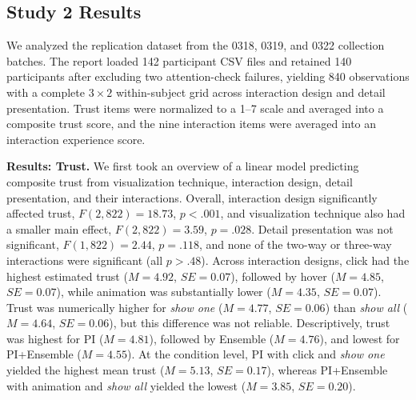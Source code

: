 \subsection{Study 2 Results}
We analyzed the replication dataset from the 0318, 0319, and 0322 collection batches. The report loaded 142 participant CSV files and retained 140 participants after excluding two attention-check failures, yielding 840 observations with a complete $3 \times 2$ within-subject grid across interaction design and detail presentation. Trust items were normalized to a 1--7 scale and averaged into a composite trust score, and the nine interaction items were averaged into an interaction experience score.

\noindent\textbf{Results: Trust.}
We first took an overview of a linear model predicting composite trust from visualization technique, interaction design, detail presentation, and their interactions. Overall, interaction design significantly affected trust, $F(2, 822)=18.73$, $p<.001$, and visualization technique also had a smaller main effect, $F(2, 822)=3.59$, $p=.028$. Detail presentation was not significant, $F(1, 822)=2.44$, $p=.118$, and none of the two-way or three-way interactions were significant (all $p>.48$). Across interaction designs, click had the highest estimated trust ($M=4.92$, $SE=0.07$), followed by hover ($M=4.85$, $SE=0.07$), while animation was substantially lower ($M=4.35$, $SE=0.07$). Trust was numerically higher for \textit{show one} ($M=4.77$, $SE=0.06$) than \textit{show all} ($M=4.64$, $SE=0.06$), but this difference was not reliable. Descriptively, trust was highest for PI ($M=4.81$), followed by Ensemble ($M=4.76$), and lowest for PI+Ensemble ($M=4.55$). At the condition level, PI with click and \textit{show one} yielded the highest mean trust ($M=5.13$, $SE=0.17$), whereas PI+Ensemble with animation and \textit{show all} yielded the lowest ($M=3.85$, $SE=0.20$).

